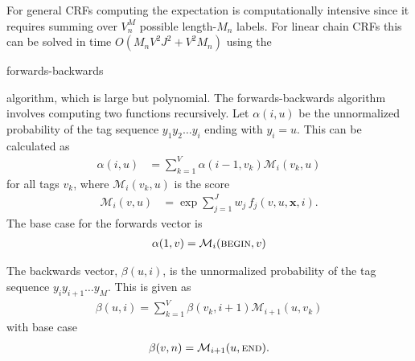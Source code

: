 \documentclass[10pt,twocolumn,letterpaper]{article}
\newcommand{\x}{\mathbf{x}}
\begin{document}
\newcommand{\M}{\mathcal{M}}

For general CRFs computing the expectation is computationally intensive since it requires summing over $V^M_n$ possible length-$M_n$ labels. For linear chain CRFs this can be solved in time $O(M_n V^2 J^2 + V^2 M_n)$ using the 
\begin{em}forwards-backwards\end{em}
algorithm, which is large but polynomial. The forwards-backwards algorithm involves computing two functions recursively. Let $\alpha(i,u)$ be the unnormalized  probability of the tag sequence $y_1 y_2 \dots y_i$ ending with $y_i  = u$. This can be calculated as
\begin{align}
	\alpha(i,u) &= \sum_{k=1}^V \alpha(i-1, v_k) \M_i(v_k,u)
\end{align}
for all tags $v_k$, where $\M_i(v_k,u)$ is the score
\begin{align}
	\M_i(v,u) &= \exp \sum_{j=1}^J w_j\, f_j(v,u,\x,i).
\end{align}
The base case for the forwards vector is
\begin{align}
	\alpha(1,v) = \M_i(\mbox{\textsc{begin}},v)
\end{align}

The backwards vector, $\beta(u,i)$, is the unnormalized probability of the tag sequence $y_i y_{i+1}\dots y_{M}$.  This is given as
\begin{align}
	\beta(u,i) = \sum_{k=1}^V \beta(v_k,i+1)\M_{i+1}(u,v_k)
\end{align}
with base case
\begin{align}
	\beta(v,n) = \M_{i+1}(u,\mbox{\textsc{end}}).
\end{align}
\end{document}
